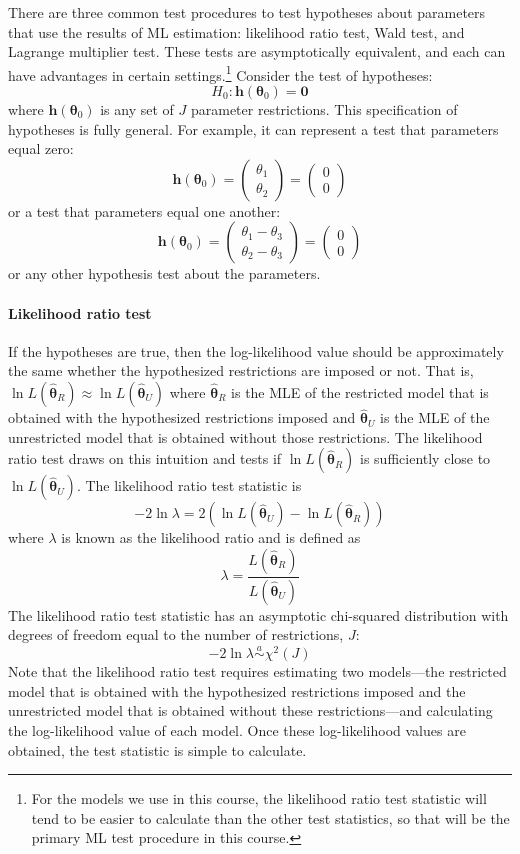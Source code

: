 \documentclass[11pt,letterpaper]{article}
\begin{document}
There are three common test procedures to test hypotheses about parameters that use the results of ML estimation: likelihood ratio test, Wald test, and Lagrange multiplier test. These tests are asymptotically equivalent, and each can have advantages in certain settings.\footnote{For the models we use in this course, the likelihood ratio test statistic will tend to be easier to calculate than the other test statistics, so that will be the primary ML test procedure in this course.} Consider the test of hypotheses:
$$H_0: \bm{h}(\bm{\theta}_0) = \bm{0}$$
where $\bm{h}(\bm{\theta}_0)$ is any set of $J$ parameter restrictions. This specification of hypotheses is fully general. For example, it can represent a test that parameters equal zero:
$$\bm{h}(\bm{\theta}_0) = \begin{pmatrix}
  \theta_1 \\
  \theta_2
\end{pmatrix} = \begin{pmatrix}
  0 \\
  0
\end{pmatrix}$$
or a test that parameters equal one another:
$$\bm{h}(\bm{\theta}_0) = \begin{pmatrix}
  \theta_1 - \theta_3 \\
  \theta_2 - \theta_3
\end{pmatrix} = \begin{pmatrix}
  0 \\
  0
\end{pmatrix}$$
or any other hypothesis test about the parameters.

\paragraph{Likelihood ratio test} If the hypotheses are true, then the log-likelihood value should be approximately the same whether the hypothesized restrictions are imposed or not. That is, $\ln L(\widehat{\bm{\theta}}_R) \approx \ln L(\widehat{\bm{\theta}}_U)$ where $\widehat{\bm{\theta}}_R$ is the MLE of the restricted model that is obtained with the hypothesized restrictions imposed and $\widehat{\bm{\theta}}_U$ is the MLE of the unrestricted model that is obtained without those restrictions. The likelihood ratio test draws on this intuition and tests if $\ln L(\widehat{\bm{\theta}}_R)$ is sufficiently close to $\ln L(\widehat{\bm{\theta}}_U)$. The likelihood ratio test statistic is
$$-2 \ln \lambda = 2 \left( \ln L(\widehat{\bm{\theta}}_U) - \ln L(\widehat{\bm{\theta}}_R) \right)$$
where $\lambda$ is known as the likelihood ratio and is defined as
$$\lambda = \frac{L(\widehat{\bm{\theta}}_R)}{L(\widehat{\bm{\theta}}_U)}$$
The likelihood ratio test statistic has an asymptotic chi-squared distribution with degrees of freedom equal to the number of restrictions, $J$:
$$-2 \ln \lambda \overset{a}{\sim} \chi^2(J)$$
Note that the likelihood ratio test requires estimating two models---the restricted model that is obtained with the hypothesized restrictions imposed and the unrestricted model that is obtained without these restrictions---and calculating the log-likelihood value of each model. Once these log-likelihood values are obtained, the test statistic is simple to calculate.
\end{document}
